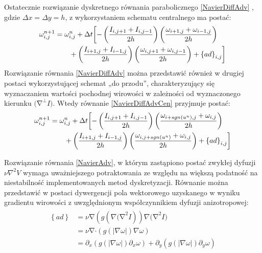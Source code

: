 \documentclass[12pt, twoside, openany]{report}
\theoremstyle{definition}
\begin{document}
Ostatecznie rozwiązanie dyskretnego równania parabolicznego \eqref{NavierDiffAdv} , gdzie $\Delta x= \Delta y=h$, z wykorzystaniem schematu centralnego ma postać:
\begin{align}
{\omega }^{n+1}_{i,j} &= {\omega }^n_{i,j}+\Delta t\biggl[
-\left(\frac{I_{i,j+1}+I_{i,j-1}}{2h}\right)\left(\frac{{\omega }_{i+1,j}
+{\omega }_{i-1,j}}{2h}\right)  \notag\\ 
&\qquad+ \left(\frac{I_{i+1,j}+I_{i-1,j}}{2h}\right)\left(\frac{{\omega }_{i,j+1}+{\omega }_{i,j-1}}{2h}\right)+{\left\{ad\right\}}_{i,j} \biggr]
\label{NavierDiffAdvCen}
\end{align}
Rozwiązanie równania \eqref{NavierDiffAdv} można przedstawić również w drugiej postaci wykorzystującej schemat „do przodu”, charakteryzujący się wyznaczaniem wartości pochodnej wirowości w zależności od wyznaczonego kierunku ${\mathrm{(}\mathrm{\nabla }}^{\bot }I)$.  Wtedy równanie \eqref{NavierDiffAdvCen} przyjmuje postać:
\begin{align}
{\omega }^{n+1}_{i,j} &= {\omega }^n_{i,j}+\Delta t\biggl[
-\left(\frac{I_{i,j+1}+I_{i,j-1}}{2h}\right)\left(\frac{{\omega }_{i+sgn\left(u^n\right),j}+{\omega }_{i,j}}{2h}\right)  \notag\\ 
&\qquad+ \left(\frac{I_{i+1,j}+I_{i-1,j}}{2h}\right)\left(\frac{{\omega }_{i,j+sgn(u^n)}+{\omega }_{i,j}}{2h}\right)+{\left\{ad\right\}}_{i,j} \biggr]
\label{NavierDiffAdvFor}
\end{align}
\par
Rozwiązanie równania \eqref{NavierAdv}, w którym zastąpiono postać zwykłej dyfuzji $\nu {\nabla }^2V$ wymaga uważniejszego potraktowania ze względu na większą podatność na niestabilność implementowanych metod dyskretyzacji. Równanie można przedstawić w postaci dywergencji pola wektorowego uzyskanego w wyniku gradientu wirowości z uwzględnionym współczynnikiem dyfuzji anizotropowej:
\begin{align}
\begin{aligned}
\left\{ad\right\} 
&= \nu \mathrm{\nabla }(g(\nabla {\mathrm{(}\mathrm{\nabla }}^2I))\nabla {\mathrm{(}\mathrm{\nabla }}^2I) \\[1ex]
&= \nu \mathrm{\nabla }\mathrm{\cdot}(g(|\nabla \omega |)\nabla \omega )   \\[1ex]
&= {\partial }_x\left(g\left(\left|\nabla \omega \right|\right){\partial }_x\omega \right)+{\partial }_y\left(g\left(\left|\nabla \omega \right|\right){\partial }_y\omega \right)
\end{aligned}
\label{Anisotropic}
\end{align}
\end{document}
